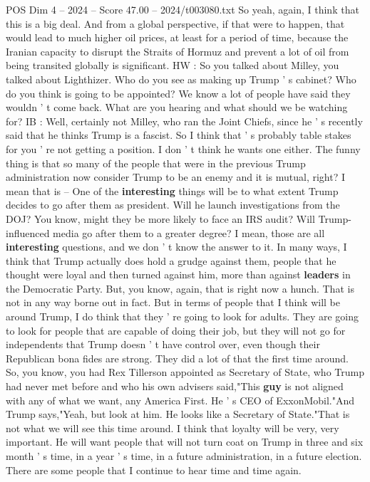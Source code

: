 \begin{textsample}{POS Dim 4 – 2024 – Score 47.00 – 2024/t003080.txt}
So yeah, again, I think that this is a big deal.
And from a global perspective, if that were to happen, that would lead to much higher oil prices, at least for a period of time, because the Iranian capacity to disrupt the Straits of Hormuz and prevent a lot of oil from being transited globally is significant.
HW : So you talked about Milley, you talked about Lighthizer.
Who do you see as making up Trump ' s cabinet?
Who do you think is going to be appointed?
We know a lot of people have said they wouldn ' t come back.
What are you hearing and what should we be watching for?
IB : Well, certainly not Milley, who ran the Joint Chiefs, since he ' s recently said that he thinks Trump is a fascist.
So I think that ' s probably table stakes for you ' re not getting a position.
I don ' t think he wants one either.
The funny thing is that so many of the people that were in the previous Trump administration now consider Trump to be an enemy and it is mutual, right?
I mean that is -- One of the \textbf{interesting} things will be to what extent Trump decides to go after them as president.
Will he launch investigations from the DOJ?
You know, might they be more likely to face an IRS audit?
Will Trump-influenced media go after them to a greater degree?
I mean, those are all \textbf{interesting} questions, and we don ' t know the answer to it.
In many ways, I think that Trump actually does hold a grudge against them, people that he thought were loyal and then turned against him, more than against \textbf{leaders} in the Democratic Party.
But, you know, again, that is right now a hunch.
That is not in any way borne out in fact.
But in terms of people that I think will be around Trump, I do think that they ' re going to look for adults.
They are going to look for people that are capable of doing their job, but they will not go for independents that Trump doesn ' t have control over, even though their Republican bona fides are strong.
They did a lot of that the first time around.
So, you know, you had Rex Tillerson appointed as Secretary of State, who Trump had never met before and who his own advisers said,"This \textbf{guy} is not aligned with any of what we want, any America First.
He ' s CEO of ExxonMobil."And Trump says,"Yeah, but look at him.
He looks like a Secretary of State."That is not what we will see this time around.
I think that loyalty will be very, very important.
He will want people that will not turn coat on Trump in three and six month ' s time, in a year ' s time, in a future administration, in a future election.
There are some people that I continue to hear time and time again.

\end{textsample}
